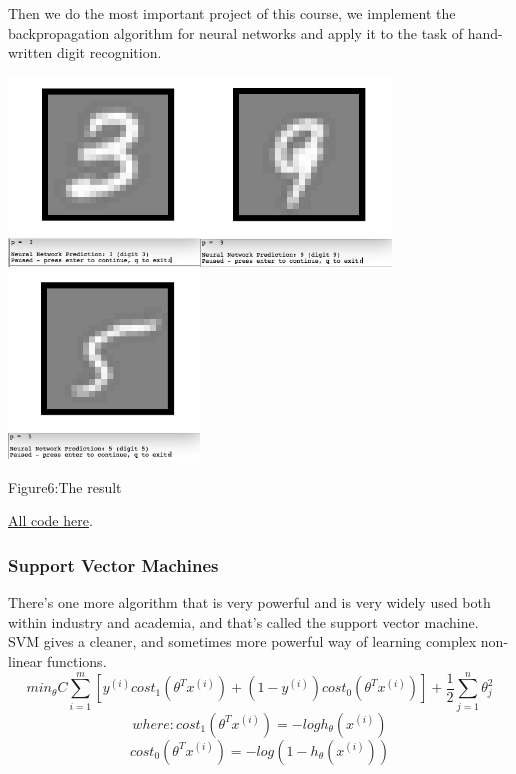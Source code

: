 \documentclass[a4paper]{article}
\begin{document}
{Then we do the most important project of this course, we implement the backpropagation algorithm for neural networks and apply it to the task of hand-written digit recognition.

\includegraphics[width=2in]{3.png}\includegraphics[width=2in]{9.png}\includegraphics[width=2in]{5.png}
\begin{center}
Figure6:The result
\end{center}
\href{https://github.com/GuangYueCHEN/ENSIIE/tree/master/Plus/MachineLearning/machine-learning-ex3}{All code here}.\\
\subsubsection{\textbf{Support Vector Machines}}
  There's one more algorithm that is very powerful and is very widely used both within industry and academia, and that's called the support vector machine. SVM gives a cleaner, and sometimes more powerful way of learning complex non-linear functions.
 $$min_\theta C\sum_{i=1}^m[y^{(i)}cost_1(\theta^Tx^{(i)})+(1-y^{(i)})cost_0(\theta^Tx^{(i)})]+\frac{1}{2}\sum_{j=1}^n\theta^2_j$$$$where:cost_1(\theta^Tx^{(i)})=-logh_\theta(x^{(i)})$$$$cost_0(\theta^Tx^{(i)})=-log(1-h_\theta(x^{(i)}))$$
 
}
\end{document}
